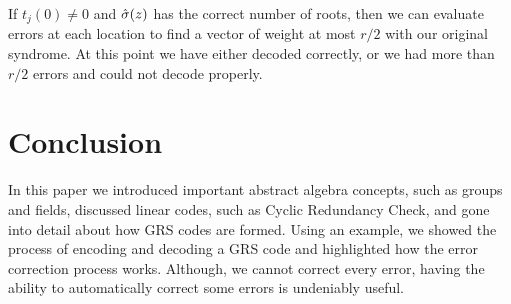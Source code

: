 \documentclass{article}
\begin{document}
If $t_{j}(0) \neq 0$ and $\Hat{\sigma}(z)$ has the correct number of roots, then we can evaluate errors at each location to find a vector of weight at most $r/2$ with our original syndrome. At this point we have either decoded correctly, or we had more than $r/2$ errors and could not decode properly.

\section{Conclusion}
In this paper we introduced important abstract algebra concepts, such as groups and fields, discussed linear codes, such as Cyclic Redundancy Check, and gone into detail about how GRS codes are formed. Using an example, we showed the process of encoding and decoding a GRS code and highlighted how the error correction process works. Although, we cannot correct every error, having the ability to automatically correct some errors is undeniably useful.




\end{document}
